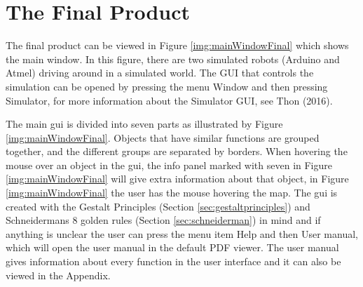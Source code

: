 \section{The Final Product}
The final product can be viewed in Figure \ref{img:mainWindowFinal} which shows the main window. In this figure, there are two simulated robots (Arduino and Atmel) driving around in a simulated world. The GUI that controls the simulation can be opened by pressing the menu Window and then pressing Simulator, for more information about the Simulator GUI, see Thon (2016).


The main \acrshort{gui} is divided into seven parts as illustrated by Figure \ref{img:mainWindowFinal}. Objects that have similar functions are grouped together, and the different groups are separated by borders. When hovering the mouse over an object in the \acrshort{gui}, the info panel marked with seven in Figure \ref{img:mainWindowFinal} will give extra information about that object, in Figure \ref{img:mainWindowFinal} the user has the mouse hovering the map. The \acrshort{gui} is created with the Gestalt Principles (Section \ref{sec:gestaltprinciples}) and Schneidermans 8 golden rules (Section \ref{sec:schneiderman}) in mind and if anything is unclear the user can press the menu item Help and then User manual, which will open the user manual in the default PDF viewer. The user manual gives information about every function in the user interface and it can also be viewed in the Appendix. 